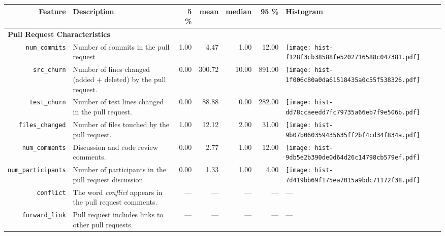 \begin{table*}[ht]
\centering
\begin{small}
\begin{tabular}{rp{24em}rrrrl}
  \hline
  \bfseries{Feature} & \bfseries{Description} & \bfseries{5 \%} & \bfseries{mean} & \bfseries{median} & \bfseries{95 \%} & \bfseries{Histogram} \\ 
  \hline

  \multicolumn{2}{l}{\bf{Pull Request Characteristics}}\\

  \texttt{num\_commits} & Number of commits in the pull request & 1.00 & 4.47 & 1.00 & 12.00 & \texttt{[image: hist-f128f3cb38588fe5202716588c047381.pdf]} \\ 
  \texttt{src\_churn} & Number of lines changed (added + deleted) by the pull request. & 0.00 & 300.72 & 10.00 & 891.00 & \texttt{[image: hist-1f006c80a0da61518435a0c55f538326.pdf]} \\ 
  \texttt{test\_churn} & Number of test lines changed in the pull request. & 0.00 & 88.88 & 0.00 & 282.00 & \texttt{[image: hist-dd78ccaeedd7fc79735a66eb7f9e506b.pdf]} \\ 
  \texttt{files\_changed} & Number of files touched by the pull request. & 1.00 & 12.12 & 2.00 & 31.00 & \texttt{[image: hist-9b07b060359435635ff2bf4cd34f834a.pdf]} \\ 
  \texttt{num\_comments} & Discussion and code review comments. & 0.00 & 2.77 & 1.00 & 12.00 & \texttt{[image: hist-9db5e2b390de0d64d26c14798cb579ef.pdf]} \\ 
 
  \texttt{num\_participants} & Number of participants in the pull request discussion & 0.00 & 1.33 & 1.00 & 4.00 & \texttt{[image: hist-7d419bb69f175ea7015a9bdc71172f38.pdf]} \\

  \texttt{conflict} & The word \emph{conflict} appears in the pull request comments.  & --- & --- & --- & --- & ---\\

    \texttt{forward\_link} & Pull request includes links to other
    pull requests. & --- & --- & --- & --- & --- \\



\end{tabular}
\end{small}
\end{table*}
